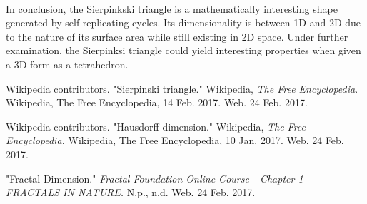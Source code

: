 \documentclass{article}
\begin{document}
\paragraph{}
In conclusion, the Sierpinkski triangle is a mathematically interesting shape generated by self replicating cycles. Its dimensionality is between 1D and 2D due to the nature of its surface area while still existing in 2D space. Under further examination, the Sierpinksi triangle could yield interesting properties when given a 3D form as a tetrahedron.

\medskip

\begin{thebibliography}{9}
Wikipedia contributors. "Sierpinski triangle." Wikipedia, \textit{The Free Encyclopedia}. Wikipedia, The Free Encyclopedia, 14 Feb. 2017. Web. 24 Feb. 2017.

Wikipedia contributors. "Hausdorff dimension." Wikipedia, \textit{The Free Encyclopedia.} Wikipedia, The Free Encyclopedia, 10 Jan. 2017. Web. 24 Feb. 2017.

"Fractal Dimension." \textit{Fractal Foundation Online Course - Chapter 1 - FRACTALS IN NATURE.} N.p., n.d. Web. 24 Feb. 2017.
\end{thebibliography}
\end{document}
